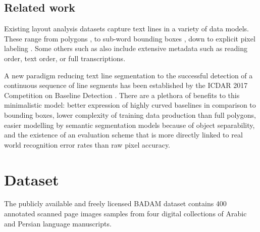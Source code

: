\subsection{Related work}

Existing layout analysis datasets capture text lines in a variety of data
models. These range from polygons
\cite{fischer2011transcription,simistira2016diva,clausner2018icfhr}, to
sub-word bounding boxes \cite{kassis2017vml}, down to explicit pixel labeling
\cite{gatos2010icfhr}. Some others such as
\cite{antonacopoulos2015icdar2015,antonacopoulos2011historical} also include
extensive metadata such as reading order, text order, or full transcriptions.

A new paradigm reducing text line segmentation to the successful detection of a
continuous sequence of line segments has been established by the ICDAR 2017
Competition on Baseline Detection \cite{diem2017cbad}. There are a plethora of
benefits to this minimalistic model: better expression of highly curved
baselines in comparison to bounding boxes, lower complexity of training data
production than full polygons, easier modelling by semantic segmentation models
because of object separability, and the existence of an evaluation scheme
\cite{gruning2018read} that is more directly linked to real world recognition
error rates than raw pixel accuracy.


\section{Dataset}

The publicly available and freely licensed BADAM dataset contains 400 annotated
scanned page images samples from four digital collections of Arabic and Persian
language manuscripts.

